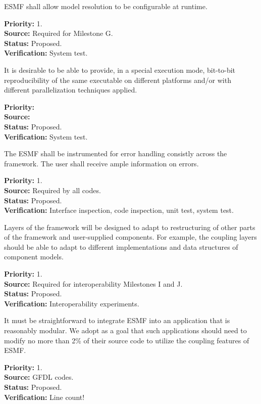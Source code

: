 ESMF shall allow model resolution to be configurable at runtime.
\begin{reqlist}
{\bf Priority:} 1. \\
{\bf Source:} Required for Milestone G. \\
{\bf Status:} Proposed. \\
{\bf Verification:} System test.
\end{reqlist}

It is desirable to be able to provide, in a special execution 
mode, bit-to-bit reproducibility of the same executable on different 
platforms and/or with different parallelization techniques applied.
\begin{reqlist}
{\bf Priority:} \\
{\bf Source:} \\
{\bf Status:} Proposed. \\
{\bf Verification:} System test.
\end{reqlist}

The ESMF shall be instrumented for error handling consistly across the
framework.  The user shall receive ample information on errors.
\begin{reqlist}
{\bf Priority:} 1. \\
{\bf Source:} Required by all codes. \\
{\bf Status:} Proposed. \\
{\bf Verification:} Interface inspection, code inspection, unit test, system test.
\end{reqlist}

Layers of the framework will be designed to adapt to
restructuring of other parts of the framework and user-supplied components.  
For example, the coupling layers should be able to adapt to different 
implementations and data structures of component models.
\begin{reqlist}
{\bf Priority:} 1. \\
{\bf Source:} Required for interoperability Milestones I and J. \\
{\bf Status:} Proposed. \\
{\bf Verification:} Interoperability experiments.
\end{reqlist}

It must be straightforward to integrate ESMF into an application 
that is reasonably modular.  We adopt as a goal that such applications should
need to modify no more than 2\% of their source code to utilize the coupling
features of ESMF.
\begin{reqlist}
{\bf Priority:} 1. \\
{\bf Source:} GFDL codes. \\
{\bf Status:} Proposed. \\
{\bf Verification:} Line count!
\end{reqlist}

